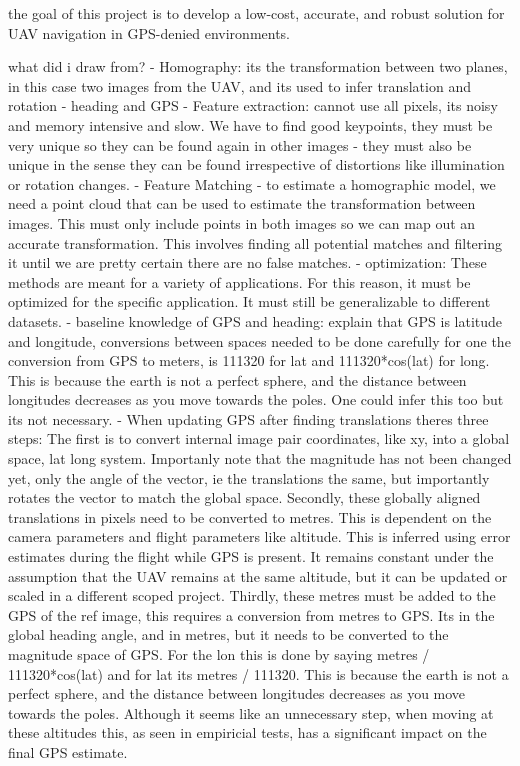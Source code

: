 the goal of this project is to develop a low-cost, accurate, and robust solution for UAV navigation in GPS-denied environments.


what did i draw from?
- Homography: its the transformation between two planes, in this case two images from the UAV, and its used to infer translation and rotation - heading and GPS
- Feature extraction: cannot use all pixels, its noisy and memory intensive and slow. We have to find good keypoints, they must be very unique so they can be found again in other images  - they must also be unique in the sense they can be found irrespective of distortions like illumination or rotation changes. 
- Feature Matching - to estimate a homographic model, we need a point cloud that can be used to estimate the transformation between images. This must only include points in both images so we can map out an accurate transformation. This involves finding all potential matches and filtering it until we are pretty certain there are no false matches.
- optimization: These methods are meant for a variety of applications. For this reason, it must be optimized for the specific application. It must still be generalizable to different datasets. 
- baseline knowledge of GPS and heading: explain that GPS is latitude and longitude,
conversions between spaces needed to be done carefully
for one the conversion from GPS to meters, is 111320 for lat and 111320*cos(lat) for long. This is because the earth is not a perfect sphere, and the distance between longitudes decreases as you move towards the poles. One could infer this too but its not necessary. 
- When updating GPS after finding translations theres three steps: The first is to convert internal image pair coordinates, like xy, into a global space, lat long system. Importanly note that the magnitude has not been changed yet, only the angle of the vector, ie the translations the same, but importantly rotates the vector to match the global space. 
Secondly, these globally aligned translations in pixels need to be converted to metres. This is dependent on the camera parameters and flight parameters like altitude. This is inferred using error estimates during the flight while GPS is present. It remains constant under the assumption that the UAV remains at the same altitude, but it can be updated or scaled in a different scoped project. 
Thirdly, these metres must be added to the GPS of the ref image, this requires a conversion from metres to GPS. Its in the global heading angle, and in metres, but it needs to be converted to the magnitude space of GPS. For the lon this is done by saying metres / 111320*cos(lat) and for lat its metres / 111320. This is because the earth is not a perfect sphere, and the distance between longitudes decreases as you move towards the poles. Although it seems like an unnecessary step, when moving at these altitudes this, as seen in empiricial tests, has a significant impact on the final GPS estimate.

